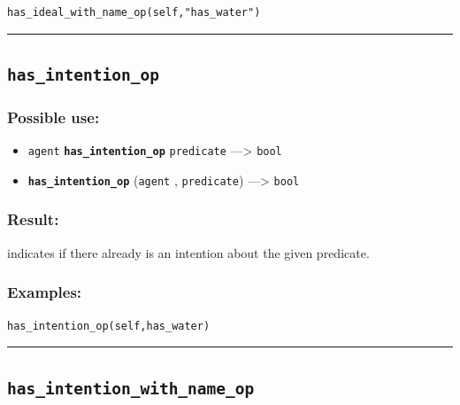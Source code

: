 \documentclass[]{book}
\providecommand{\tightlist}{%
  \setlength{\itemsep}{0pt}\setlength{\parskip}{0pt}}
\theoremstyle{definition}
\theoremstyle{definition}
\theoremstyle{definition}
\theoremstyle{remark}
\begin{document}
\begin{verbatim}
has_ideal_with_name_op(self,"has_water") 
\end{verbatim}

\begin{center}\rule{0.5\linewidth}{\linethickness}\end{center}

\subsection{\texorpdfstring{\texttt{has\_intention\_op}}{has\_intention\_op}}\label{has_intention_op}

\subsubsection{Possible use:}\label{possible-use-252}

\begin{itemize}
\tightlist
\item
  \texttt{agent} \textbf{\texttt{has\_intention\_op}} \texttt{predicate}
  ---\textgreater{} \texttt{bool}
\item
  \textbf{\texttt{has\_intention\_op}} (\texttt{agent} ,
  \texttt{predicate}) ---\textgreater{} \texttt{bool}
\end{itemize}

\subsubsection{Result:}\label{result-243}

indicates if there already is an intention about the given predicate.

\subsubsection{Examples:}\label{examples-192}

\begin{verbatim}
has_intention_op(self,has_water) 
\end{verbatim}

\begin{center}\rule{0.5\linewidth}{\linethickness}\end{center}

\subsection{\texorpdfstring{\texttt{has\_intention\_with\_name\_op}}{has\_intention\_with\_name\_op}}\label{has_intention_with_name_op}
\end{document}
